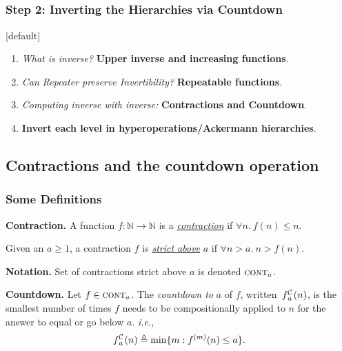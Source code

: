 \subsection*{}
\begin{frame}
\frametitle{Step 2: Inverting the Hierarchies via \textbf{Countdown}}
[default]

\begin{enumerate}[\bfseries 1.]
	\itemsep 3ex
	\item<done@1->
	\emph{What is inverse?} \textbf{Upper inverse and increasing functions}.
	
	\item<done@1->
	\emph{Can Repeater preserve Invertibility?} \textbf{Repeatable functions}.
	
	\item<come@2->
	\emph{Computing inverse with inverse:} \textbf{Contractions and Countdown}.
	
	\item
	\textbf{Invert each level in hyperoperations/Ackermann hierarchies}.
\end{enumerate}
\end{frame}


\subsection{Contractions and the countdown operation}


\begin{frame}
\frametitle{Some Definitions}
\textbf{Contraction.} A function $f : \mathbb{N} \to \mathbb{N}$ is a
\href{https://github.com/inv-ack/inv-ack/blob/7270e64a2600b771f2b1b1b151f7d13fb2ae6c97/countdown.v\#L40-L42}{\emph{contraction}} if $\forall n.~ f(n) \le n$.

Given an $a \ge 1$, a contraction $f$ is
\href{https://github.com/inv-ack/inv-ack/blob/7270e64a2600b771f2b1b1b151f7d13fb2ae6c97/countdown.v\#L44-L46}{\emph{strict above}} $a$ if $\forall n > a.~n > f(n)$.

\bigskip

\textbf{Notation.} Set of contractions strict above $a$ is denoted $\text{\scshape{cont}}_a$.

\bigskip

\textbf{Countdown.} Let $f\in \text{\scshape{cont}}_a$. The \textit{countdown to} $a$ of $f$, written~$\cdt{f}{a}(n)$, is the smallest number of times $f$ needs to be compositionally applied to
$n$ for the answer to equal or go below $a$. \emph{i.e.},
\begin{equation*}
\cdt{f}{a}(n) \triangleq \min\{m: f^{(m)}(n)\le a \}.
\end{equation*}
\end{frame}


